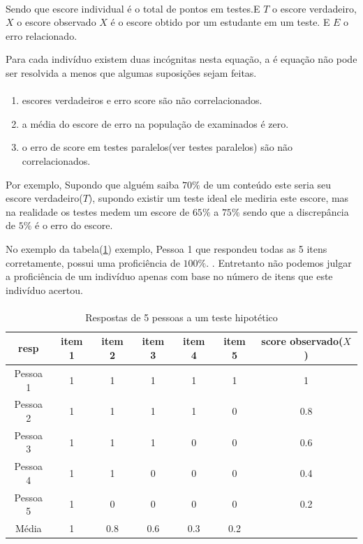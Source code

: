 	\paragraph{}
	    Sendo que escore individual é o total de pontos em testes\cite{Ribeiro}.E $T$ o escore verdadeiro, $X$ o escore observado $X$ é o escore obtido por um estudante em um teste. E $E$ o erro relacionado.
	\par
	    Para cada indivíduo  existem duas incógnitas nesta equação, a é equação não pode ser resolvida a menos que algumas suposições sejam feitas.\cite{Klein}
	\paragraph{}
	\begin{enumerate}[label={\alph*)},noitemsep]
        \item escores verdadeiros e erro score são não correlacionados.
        \item a média do escore de erro na população de examinados é zero.
        \item o erro de score em testes paralelos(ver testes paralelos) são não correlacionados.
	\end{enumerate}
	\par
	   Por exemplo, Supondo que alguém saiba $70\%$ de um conteúdo este seria seu escore verdadeiro($T$), supondo existir um teste ideal ele mediria este escore, mas na realidade os testes medem um escore de $65\%$ a $75\%$ sendo que a discrepância de $5\%$ é o erro do escore.
    \par
    	No exemplo da tabela(\ref{tab:pessoas1}) exemplo, Pessoa 1 que respondeu todas as 5 itens corretamente, possui uma proficiência de $100\%$. \cite{Chong}. Entretanto não podemos julgar a proficiência de um indivíduo apenas com base no número de itens que este indivíduo acertou.
    \paragraph{}
    \begin{table}[!h]
    	\centering
    	\caption{Respostas de 5 pessoas a um teste hipotético}
    	\begin{tabular}{*{6}{c|}c}
    	    \hline
    	    resp & item 1& item 2& item 3 & item 4 & item 5 & score observado($X$)\\
    	    \hline
    	    \hline
    	     Pessoa 1 &  1 & 1 & 1 & 1 & 1 & 1\\
    	     Pessoa 2 &  1 & 1 & 1 & 1 & 0 & 0.8\\
    	     Pessoa 3 &  1 & 1 & 1 & 0 & 0 & 0.6\\
    	     Pessoa 4 &  1 & 1 & 0 & 0 & 0 & 0.4\\
             Pessoa 5 &  1 & 0 & 0 & 0 & 0 & 0.2\\
             Média &     1 & 0.8 & 0.6 & 0.3 & 0.2\\
             \hline
    	\end{tabular}
	    \label{tab:pessoas1}
	\end{table}
